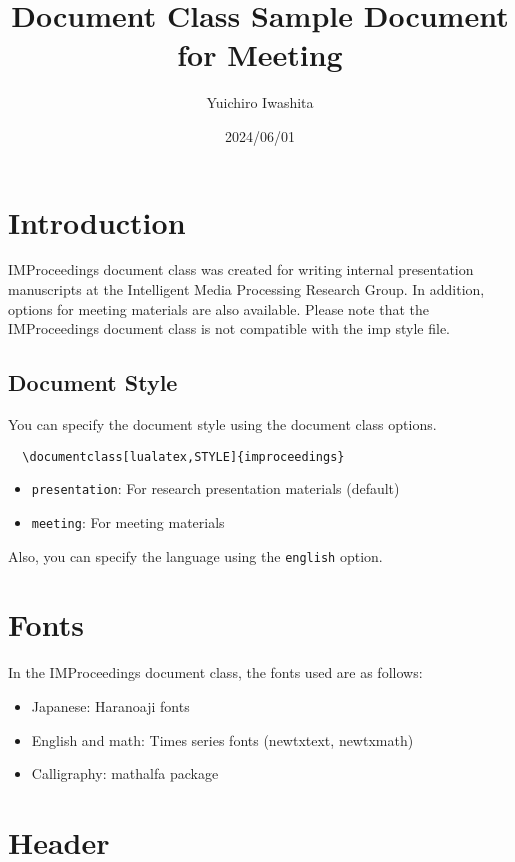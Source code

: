 \documentclass[
  platex,
  dvipdfmx,
  meeting,
  english
]{improceedings}
\title{\pkg{IMProceedings} Document Class Sample Document for Meeting}
\date{2024/06/01}
\author{Yuichiro Iwashita}
\newcommand{\pkg}[1]{\textsf{#1}}
\newcommand{\code}[1]{\texttt{#1}}
\begin{document}
\maketitle

\section{Introduction}

\pkg{IMProceedings} document class was created for writing internal presentation manuscripts at the Intelligent Media Processing Research Group.
In addition, options for meeting materials are also available.
Please note that the \pkg{IMProceedings} document class is not compatible with the \pkg{imp} style file.

\subsection{Document Style}

You can specify the document style using the document class options.
\begin{verbatim}
  \documentclass[lualatex,STYLE]{improceedings}
\end{verbatim}
\begin{itemize}
  \item \code{presentation}: For research presentation materials (default)
  \item \code{meeting}: For meeting materials
\end{itemize}
Also, you can specify the language using the \code{english} option.

\section{Fonts}

In the \pkg{IMProceedings} document class, the fonts used are as follows:
\begin{itemize}
  \item Japanese: Haranoaji fonts
  \item English and math: Times series fonts (\pkg{newtxtext}, \pkg{newtxmath})
  \item Calligraphy: \pkg{mathalfa} package
\end{itemize}

\section{Header}
\end{document}
